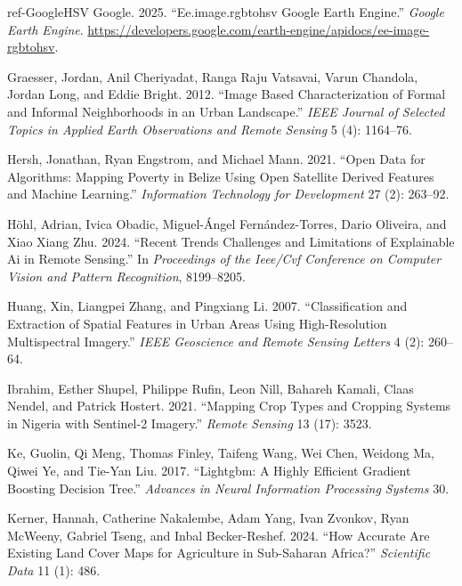 \documentclass[
  journal,
  twocolumn]{IEEEtran}
\newlength{\cslhangindent}
\newlength{\cslentryspacingunit} %
\newenvironment{CSLReferences}[2] %
 {%
  \setlength{\parindent}{0pt}
  \ifodd #1
  \let\oldpar\par
  \def\par{\hangindent=\cslhangindent\oldpar}
  \fi
  \setlength{\parskip}{#2\cslentryspacingunit}
 }%
 {}
\newenvironment{cslreferences}[2]
 {\begin{CSLReferences}{#1}{#2}}
 {\end{CSLReferences}}
\begin{document}
\begin{cslreferences}
\leavevmode\hypertarget{ref-GoogleHSV}{}%
Google. 2025. ``Ee.image.rgbtohsv Google Earth Engine.'' \emph{Google
Earth Engine}.
\url{https://developers.google.com/earth-engine/apidocs/ee-image-rgbtohsv}.

\leavevmode\hypertarget{ref-graesser2012image}{}%
Graesser, Jordan, Anil Cheriyadat, Ranga Raju Vatsavai, Varun Chandola,
Jordan Long, and Eddie Bright. 2012. ``Image Based Characterization of
Formal and Informal Neighborhoods in an Urban Landscape.'' \emph{IEEE
Journal of Selected Topics in Applied Earth Observations and Remote
Sensing} 5 (4): 1164--76.

\leavevmode\hypertarget{ref-hersh2021open}{}%
Hersh, Jonathan, Ryan Engstrom, and Michael Mann. 2021. ``Open Data for
Algorithms: Mapping Poverty in Belize Using Open Satellite Derived
Features and Machine Learning.'' \emph{Information Technology for
Development} 27 (2): 263--92.

\leavevmode\hypertarget{ref-hohl2024recent}{}%
Höhl, Adrian, Ivica Obadic, Miguel-Ángel Fernández-Torres, Dario
Oliveira, and Xiao Xiang Zhu. 2024. ``Recent Trends Challenges and
Limitations of Explainable Ai in Remote Sensing.'' In \emph{Proceedings
of the Ieee/Cvf Conference on Computer Vision and Pattern Recognition},
8199--8205.

\leavevmode\hypertarget{ref-huang2007classification}{}%
Huang, Xin, Liangpei Zhang, and Pingxiang Li. 2007. ``Classification and
Extraction of Spatial Features in Urban Areas Using High-Resolution
Multispectral Imagery.'' \emph{IEEE Geoscience and Remote Sensing
Letters} 4 (2): 260--64.

\leavevmode\hypertarget{ref-ibrahim2021mapping}{}%
Ibrahim, Esther Shupel, Philippe Rufin, Leon Nill, Bahareh Kamali, Claas
Nendel, and Patrick Hostert. 2021. ``Mapping Crop Types and Cropping
Systems in Nigeria with Sentinel-2 Imagery.'' \emph{Remote Sensing} 13
(17): 3523.

\leavevmode\hypertarget{ref-ke2017lightgbm}{}%
Ke, Guolin, Qi Meng, Thomas Finley, Taifeng Wang, Wei Chen, Weidong Ma,
Qiwei Ye, and Tie-Yan Liu. 2017. ``Lightgbm: A Highly Efficient Gradient
Boosting Decision Tree.'' \emph{Advances in Neural Information
Processing Systems} 30.

\leavevmode\hypertarget{ref-kerner2024accurate}{}%
Kerner, Hannah, Catherine Nakalembe, Adam Yang, Ivan Zvonkov, Ryan
McWeeny, Gabriel Tseng, and Inbal Becker-Reshef. 2024. ``How Accurate
Are Existing Land Cover Maps for Agriculture in Sub-Saharan Africa?''
\emph{Scientific Data} 11 (1): 486.


\end{cslreferences}
\end{document}
